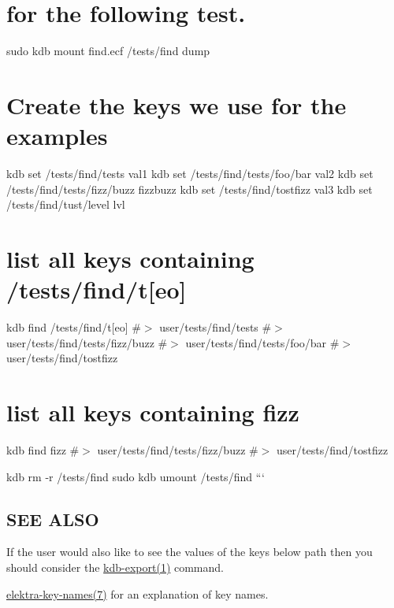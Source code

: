 \section*{for the following test.}

sudo kdb mount find.\+ecf /tests/find dump

\section*{Create the keys we use for the examples}

kdb set /tests/find/tests val1 kdb set /tests/find/tests/foo/bar val2 kdb set /tests/find/tests/fizz/buzz fizzbuzz kdb set /tests/find/tostfizz val3 kdb set /tests/find/tust/level lvl

\section*{list all keys containing /tests/find/t\mbox{[}eo\mbox{]}}

kdb find \textquotesingle{}/tests/find/t\mbox{[}eo\mbox{]}\textquotesingle{} \#$>$ user/tests/find/tests \#$>$ user/tests/find/tests/fizz/buzz \#$>$ user/tests/find/tests/foo/bar \#$>$ user/tests/find/tostfizz

\section*{list all keys containing fizz}

kdb find \textquotesingle{}fizz\textquotesingle{} \#$>$ user/tests/find/tests/fizz/buzz \#$>$ user/tests/find/tostfizz

kdb rm -\/r /tests/find sudo kdb umount /tests/find ```

\subsection*{S\+EE A\+L\+SO}


\begin{DoxyItemize}
\item If the user would also like to see the values of the keys below {\ttfamily path} then you should consider the \hyperlink{md_doc_help_kdb-export_doc_help_kdb-export_md}{kdb-\/export(1)} command.
\item \hyperlink{md_doc_help_elektra-key-names_doc_help_elektra-key-names_md}{elektra-\/key-\/names(7)} for an explanation of key names. 
\end{DoxyItemize}